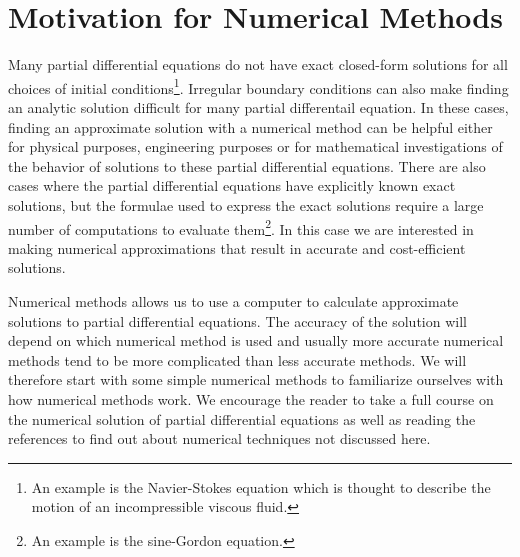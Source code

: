\chapter{Motivation for Numerical Methods}
Many partial differential equations do not have exact closed-form solutions for all choices of initial conditions\footnote{An example is the Navier-Stokes equation which is thought to describe the motion of an incompressible viscous fluid.}. Irregular boundary conditions can also make finding an analytic solution difficult for many partial differentail equation. In these cases, finding an approximate solution with a numerical method can be helpful either for physical purposes, engineering purposes or for mathematical investigations of the behavior of solutions to these partial differential equations.
There are also cases where the partial differential equations have explicitly known exact solutions, but the formulae used to express the exact solutions require a large number of computations to evaluate them\footnote{An example is the sine-Gordon equation.}. In this case we are interested in making numerical approximations that result in accurate and cost-efficient solutions.

Numerical methods allows us to use a computer to calculate approximate solutions to partial differential equations. The accuracy of the solution will depend on which numerical method is used and usually more accurate numerical methods tend to be more complicated than less accurate methods. We will therefore start with some simple numerical methods to familiarize ourselves with how numerical methods work.
We encourage the reader to take a full course on the numerical solution of partial differential equations as well as reading the references to find out about numerical techniques not discussed here.

